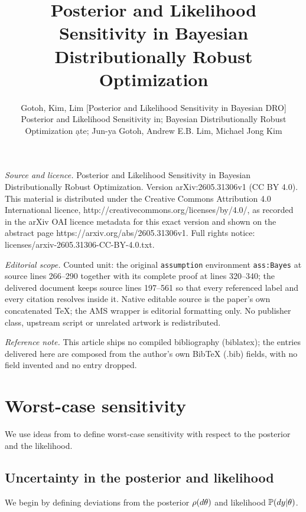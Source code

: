 \documentclass[10pt,a4paper]{amsart}
\numberwithin{equation}{section}
\numberwithin{theorem}{section}
\numberwithin{table}{section}
\numberwithin{figure}{section}
\begin{document}
\title[Posterior and Likelihood Sensitivity in Bayesian Distributio]{Posterior and Likelihood Sensitivity in Bayesian Distributionally Robust Optimization}
\author{Gotoh, Kim, Lim [Posterior and Likelihood Sensitivity in Bayesian DRO] Posterior and Likelihood Sensitivity in; Bayesian Distributionally Robust Optimization ạte; Jun-ya Gotoh, Andrew E.B. Lim, Michael Jong Kim}
\date{}
\maketitle
\noindent\emph{Source and licence.} Posterior and Likelihood Sensitivity in Bayesian Distributionally Robust Optimization. Version arXiv:2605.31306v1 (CC BY 4.0). This material is distributed under the Creative Commons Attribution 4.0 International licence, http://creativecommons.org/licenses/by/4.0/, as recorded in the arXiv OAI licence metadata for this exact version and shown on the abstract page https://arxiv.org/abs/2605.31306v1. Full rights notice: licenses/arxiv-2605.31306-CC-BY-4.0.txt.\par\smallskip
\noindent\textit{Editorial scope.} Counted unit: the original \texttt{assumption} environment \texttt{ass:Bayes} at source lines 266--290 together with its complete proof at lines 320--340; the delivered document keeps source lines 197--561 so that every referenced label and every citation resolves inside it. Native editable source is the paper's own concatenated TeX; the AMS wrapper is editorial formatting only. No publisher class, upstream script or unrelated artwork is redistributed.
\par\smallskip\noindent\textit{Reference note.} This article ships no compiled bibliography (biblatex); the entries delivered here are composed from the author's own BibTeX (.bib) fields, with no field invented and no entry dropped.
\section{Worst-case sensitivity} 
\label{sec:WCS}

We use ideas from \cite{gotoh2026sensitivity} to define worst-case sensitivity with respect to the posterior and the likelihood.  


\subsection{Uncertainty in the posterior and likelihood}

We begin by defining deviations from the posterior $\rho({\rm d}\theta)$ and likelihood ${\mathbb P}({\rm d}y | \theta)$. 
\end{document}
